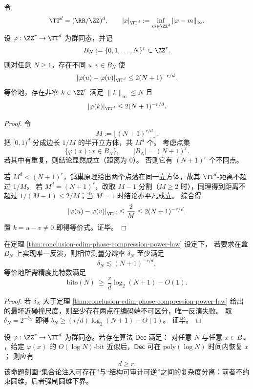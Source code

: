 \begin{theorem}[圆维压缩导致的幂律精度账本下界]\label{thm:conclusion-cdim-phase-compression-power-law}
令
\[
\TT^d=(\RR/\ZZ)^d,\qquad
|x|_{\TT^d}:=\inf_{m\in\ZZ^d}\|x-m\|_\infty.
\]
设 \(\varphi:\ZZ^r\to \TT^d\) 为群同态，并记
\[
B_N:=\{0,1,\dots,N\}^r\subset\ZZ^r.
\]
则对任意 \(N\ge 1\)，存在不同 \(u,v\in B_N\) 使
\[
|\varphi(u)-\varphi(v)|_{\TT^d}\le 2(N+1)^{-r/d}.
\]
等价地，存在非零 \(k\in\ZZ^r\) 满足 \(\|k\|_\infty\le N\) 且
\[
|\varphi(k)|_{\TT^d}\le 2(N+1)^{-r/d}.
\]
\end{theorem}
\begin{proof}
令
\[
M:=\bigl\lfloor (N+1)^{r/d}\bigr\rfloor.
\]
把 \([0,1)^d\) 分成边长 \(1/M\) 的半开立方体，共 \(M^d\) 个。
考虑点集
\[
\{\varphi(x):x\in B_N\},
\qquad |B_N|=(N+1)^r.
\]
若其中有重复，则结论显然成立（距离为 \(0\)）。
否则它有 \((N+1)^r\) 个不同点。

若 \(M^d<(N+1)^r\)，鸽巢原理给出两个点落在同一立方体，故其 \(\TT^d\)-距离不超过 \(1/M\)。
若 \(M^d=(N+1)^r\)，改取 \(M-1\) 分割（\(M\ge 2\) 时），同理得到距离不超过 \(1/(M-1)\le 2/M\)；当 \(M=1\) 时结论亦平凡成立。
综合得
\[
|\varphi(u)-\varphi(v)|_{\TT^d}\le \frac{2}{M}
\le 2(N+1)^{-r/d}.
\]
置 \(k=u-v\neq 0\) 即得等价式。证毕。
\end{proof}

\begin{corollary}[相位压缩与可逆读出的最小比特代价]\label{cor:conclusion-cdim-phase-compression-bit-lower-bound}
在定理 \ref{thm:conclusion-cdim-phase-compression-power-law} 设定下，
若要求在盒 \(B_N\) 上实现唯一反演，则相位测量分辨率 \(\delta_N\) 至少满足
\[
\delta_N\lesssim (N+1)^{-r/d},
\]
等价地所需精度比特数满足
\[
\mathrm{bits}(N)\ \ge\ \frac{r}{d}\log_2(N+1)-O(1).
\]
\end{corollary}
\begin{proof}
若 \(\delta_N\) 大于定理 \ref{thm:conclusion-cdim-phase-compression-power-law} 给出的最坏近碰撞尺度，则至少存在两点在编码端不可区分，唯一反演失败。
取 \(\delta_N=2^{-b_N}\) 即得
\(
b_N\ge (r/d)\log_2(N+1)-O(1)
\)。
证毕。
\end{proof}

\begin{conjecture}[多项式可审计算法下的圆维不可压缩性]\label{conj:conclusion-cdim-polynomial-decodability-rigidity}
设 \(\varphi:\ZZ^r\to\TT^d\) 为群同态。若存在算法 \(\mathsf{Dec}\) 满足：
对任意 \(N\) 与任意 \(x\in B_N\)，给定 \(\varphi(x)\) 的 \(O(\log N)\)-bit 近似后，\(\mathsf{Dec}\) 可在 \(\mathrm{poly}(\log N)\) 时间内恢复 \(x\)；
则应有
\[
d\ge r.
\]
该命题刻画“集合论注入可存在”与“结构可审计可逆”之间的复杂度分离：前者不约束圆维，后者强制圆维下界。
\end{conjecture}

